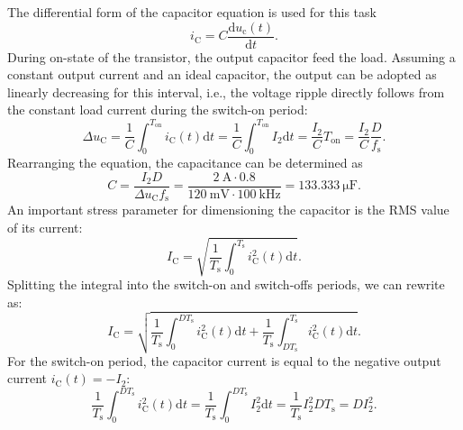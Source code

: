 \begin{solutionblock}
	The differential form of the capacitor equation is used for this task
	\begin{equation}
		i_\mathrm{C}=C \frac{\mathrm{d}u_\mathrm{c}(t)}{\mathrm{d}t}.
	\end{equation}
	During on-state of the transistor, the output capacitor feed the load. Assuming a constant output current and an ideal capacitor, the output can be adopted as linearly decreasing for this interval, i.e., the voltage ripple directly follows from the constant load current during the switch-on period:
	\begin{equation}
		\Delta u_\mathrm{C} = \frac{1}{C} \int_{0}^{T_\mathrm{on}} i_\mathrm{C}(t) \mathrm{d}t = \frac{1}{C} \int_{0}^{T_\mathrm{on}} I_\mathrm{2} \mathrm{d}t = \frac{I_\mathrm{2}}{C} T_\mathrm{on} = \frac{I_\mathrm{2}}{C} \frac{D}{f_\mathrm{s}}.
	\end{equation}
	Rearranging the equation, the capacitance can be determined as
	\begin{equation}
		C = \frac{I_\mathrm{2}D}{\Delta u_\mathrm{C}f_\mathrm{s}}=\frac{\SI{2}{\ampere}\cdot 0.8}{\SI{120}{\milli\volt} \cdot \SI{100}{\kilo\hertz}}=\SI{133.333}{\micro\farad}.
	\end{equation}
	An important stress parameter for dimensioning the capacitor is the RMS value of its current:
	\begin{equation}
		I_\mathrm{C}=\sqrt{\frac{1}{T_\mathrm{s}}\int_{0}^{T_\mathrm{s}}i_\mathrm{C}^2(t)\mathrm{d}t}.
	\end{equation}
	Splitting the integral into the switch-on and switch-offs periods, we can rewrite as:
	\begin{equation}
		I_\mathrm{C}=\sqrt{\frac{1}{T_\mathrm{s}}\int_{0}^{DT_\mathrm{s}}i_\mathrm{C}^2(t)\mathrm{d}t+\frac{1}{T_\mathrm{s}}\int_{DT_\mathrm{s}}^{T_\mathrm{s}}i_\mathrm{C}^2(t)\mathrm{d}t}.
	\end{equation}
	For the switch-on period, the capacitor current is equal to the negative output current $i_\mathrm{C}(t)=-I_\mathrm{2}$:
	\begin{equation}
		\frac{1}{T_\mathrm{s}}\int_{0}^{DT_\mathrm{s}}i_\mathrm{C}^2(t)\mathrm{d}t=\frac{1}{T_\mathrm{s}}\int_{0}^{DT_\mathrm{s}}I_\mathrm{2}^2\mathrm{d}t=\frac{1}{T_\mathrm{s}}I_\mathrm{2}^2DT_\mathrm{s}=DI_\mathrm{2}^2.

\end{equation}
\end{solutionblock}
